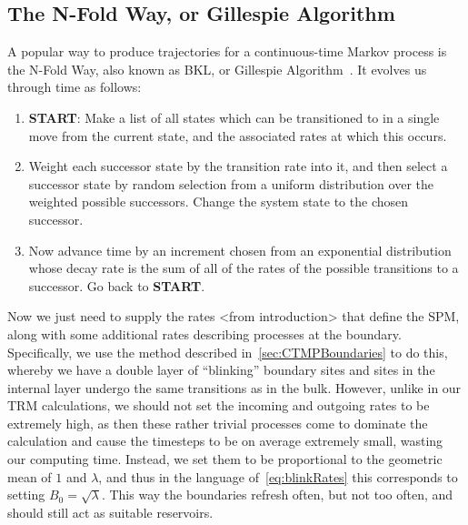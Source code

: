\subsection{The N-Fold Way, or Gillespie Algorithm} \label{sec:nFoldWay}
A popular way to produce trajectories for a continuous-time Markov process is the N-Fold Way, also known as
BKL, or Gillespie Algorithm~\cite{Bortz1975, Prados1997, voterKMC}. It evolves us through time as follows:
\begin{enumerate}
 \item \textbf{START}: Make a list of all states which can be transitioned to in a single move from the 
 current state, and the associated rates at which this occurs.
 \item Weight each successor state by the transition rate into it, and then select a successor state by
 random selection from a uniform distribution over the weighted possible successors. Change the system
 state to the chosen successor. \label{weightingChoose}
 \item Now advance time by an increment chosen from an exponential distribution whose decay rate 
 is the sum of all of the rates of the possible transitions to a successor. Go back to \textbf{START}. \label{timestepChoose}
\end{enumerate}
Now we just need to supply the rates <from introduction> that define the SPM, along with some additional rates describing processes at the boundary. Specifically, we use the method described 
in~\ref{sec:CTMPBoundaries} to do this, whereby we have a double layer of ``blinking'' boundary sites
and sites in the internal layer undergo the same transitions as in the bulk. However, unlike in our TRM
calculations, we should not set the incoming and outgoing rates to be extremely high, as then these rather
trivial processes come to dominate the calculation and cause the timesteps to be on average extremely small, wasting our computing time. Instead, we set them to
be proportional to the geometric mean of $1$ and $\lambda$, and thus in the language of~\ref{eq:blinkRates}
this corresponds to setting $B_0 = \sqrt{\lambda}$. This way the boundaries refresh often, but not too
often, and should still act as suitable reservoirs.

